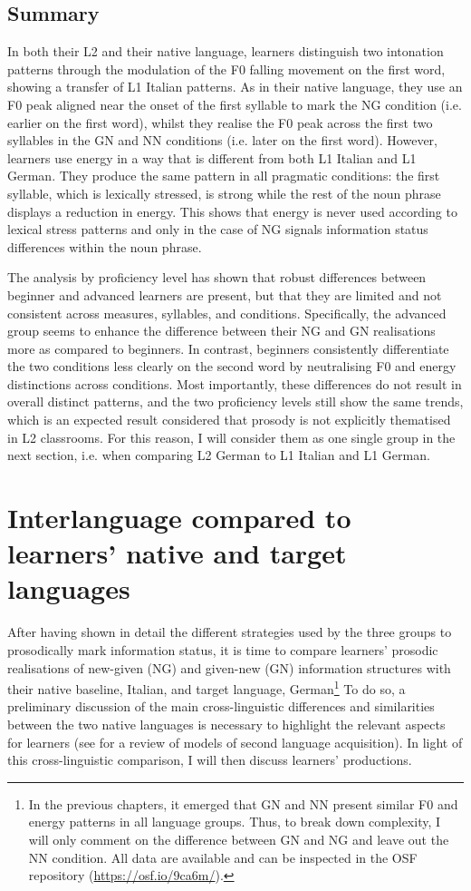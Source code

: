 \subsection{Summary}
\label{sec:2.6.2}
In both their L2 and their native language, learners distinguish two intonation patterns through the modulation of the F0 falling movement on the first word, showing a transfer of L1 Italian patterns. As in their native language, they use an F0 peak aligned near the onset of the first syllable to mark the NG condition (i.e. earlier on the first word), whilst they realise the F0 peak across the first two syllables in the GN and NN conditions (i.e. later on the first word). However, learners use energy in a way that is different from both L1 Italian and L1 German. They produce the same pattern in all pragmatic conditions: the first syllable, which is lexically stressed, is strong while the rest of the noun phrase displays a reduction in energy. This shows that energy is never used according to lexical stress patterns and only in the case of NG signals information status differences within the noun phrase.

The analysis by proficiency level has shown that robust differences between beginner and advanced learners are present, but that they are limited and not consistent across measures, syllables, and conditions. Specifically, the advanced group seems to enhance the difference between their NG and GN realisations more as compared to beginners. In contrast, beginners consistently differentiate the two conditions less clearly on the second word by neutralising F0 and energy distinctions across conditions. Most importantly, these differences do not result in overall distinct patterns, and the two proficiency levels still show the same trends, which is an expected result considered that prosody is not explicitly thematised in L2 classrooms. For this reason, I will consider them as one single group in the next section, i.e. when comparing L2 German to L1 Italian and L1 German.

\section{Interlanguage compared to learners’ native and target languages}
\label{sec:2.7}
After having shown in detail the different strategies used by the three groups to prosodically mark information status, it is time to compare learners’ prosodic realisations of new-given (NG) and given-new (GN) information structures with their native baseline, Italian, and target language, German\footnote{In the previous chapters, it emerged that GN and NN present similar F0 and energy patterns in all language groups. Thus, to break down complexity, I will only comment on the difference between GN and NG and leave out the NN condition. All data are available and can be inspected in the OSF repository (\url{https://osf.io/9ca6m/}).} To do so, a preliminary discussion of the main cross-linguistic differences and similarities between the two native languages is necessary to highlight the relevant aspects for learners (see \citealt{RasierHiligsmann2007} for a review of models of second language acquisition). In light of this cross-linguistic comparison, I will then discuss learners’ productions.

